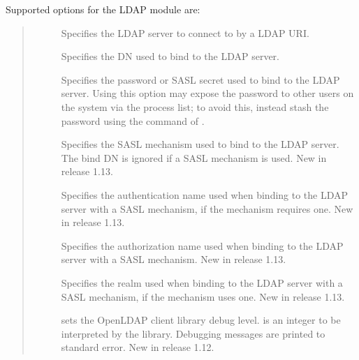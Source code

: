 \documentclass[letterpaper,10pt,english]{sphinxmanual}
\begin{document}
Supported options for the LDAP module are:
\begin{quote}
\begin{description}
\item[{}] \leavevmode
Specifies the LDAP server to connect to by a LDAP URI.

\item[{}] \leavevmode
Specifies the DN used to bind to the LDAP server.

\item[{}] \leavevmode
Specifies the password or SASL secret used to bind to the LDAP
server.  Using this option may expose the password to other
users on the system via the process list; to avoid this,
instead stash the password using the  command of
{\hyperref[\detokenize{admin/admin_commands/kdb5_ldap_util:kdb5-ldap-util-8}]{}}.

\item[{}] \leavevmode
Specifies the SASL mechanism used to bind to the LDAP server.
The bind DN is ignored if a SASL mechanism is used.  New in
release 1.13.

\item[{}] \leavevmode
Specifies the authentication name used when binding to the
LDAP server with a SASL mechanism, if the mechanism requires
one.  New in release 1.13.

\item[{}] \leavevmode
Specifies the authorization name used when binding to the LDAP
server with a SASL mechanism.  New in release 1.13.

\item[{}] \leavevmode
Specifies the realm used when binding to the LDAP server with
a SASL mechanism, if the mechanism uses one.  New in release
1.13.

\item[{}] \leavevmode
sets the OpenLDAP client library debug level.   is an
integer to be interpreted by the library.  Debugging messages
are printed to standard error.  New in release 1.12.

\end{description}
\end{quote}
\end{document}
